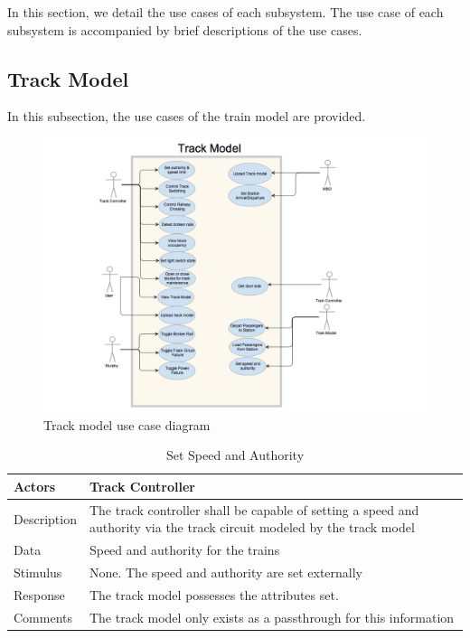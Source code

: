 \documentclass[]{article}
\begin{document}
In this section, we detail the use cases of each subsystem. The use case of each subsystem is accompanied by brief descriptions of the use cases.

\subsection{Track Model}
In this subsection, the use cases of the train model are provided.

\begin{figure}[H]
	\centering
	\includegraphics[width=\textwidth]{trackmodelusecase.png}
	\caption{Track model use case diagram}
\end{figure}
   \begin{table}[H]
   	\centering
   	\caption{Set Speed and Authority}
   	\begin{tabular}{|l|l|}
   		\hline
   		Actors & \parbox[t]{10cm}{Track Controller} \\ \hline
   		Description & \parbox[t]{10cm}{The track controller shall be capable of setting a speed and authority via the track circuit modeled by the track model} \\ \hline
   		Data &  \parbox[t]{10cm}{Speed and authority for the trains} \\ \hline
   		Stimulus &  \parbox[t]{10cm}{None. The speed and authority are set externally } \\ \hline
   		Response & \parbox[t]{10cm}{The track model possesses the attributes set.}\\ \hline
   		Comments & \parbox[t]{10cm}{ The track model only exists as a passthrough for this information }  \\ \hline
   	\end{tabular}
   \end{table}
   
\end{document}
